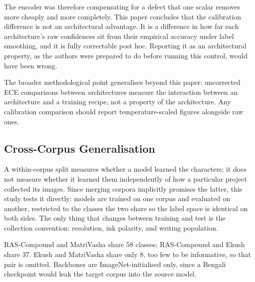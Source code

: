 The encoder was therefore compensating for a defect that one scalar
removes more cheaply and more completely. This paper concludes that the
calibration difference is not an architectural advantage. It is a
difference in how far each architecture's raw confidences sit from their
empirical accuracy under label smoothing, and it is fully correctable
post hoc. Reporting it as an architectural property, as the authors were
prepared to do before running this control, would have been wrong.

The broader methodological point generalises beyond this paper:
uncorrected ECE comparisons between architectures measure the
interaction between an architecture and a training recipe, not a
property of the architecture. Any calibration comparison should report
temperature-scaled figures alongside raw ones.

\hypertarget{cross-corpus-generalisation}{%
\subsection{Cross-Corpus
Generalisation}\label{cross-corpus-generalisation}}

A within-corpus split measures whether a model learned the characters;
it does not measure whether it learned them independently of how a
particular project collected its images. Since merging corpora
implicitly promises the latter, this study tests it directly: models are trained on one corpus and evaluated on another, restricted to the classes the two share so
the label space is identical on both sides. The only thing that changes
between training and test is the collection convention: resolution,
ink polarity, and writing population.

RAS-Compound and MatriVasha share 58 classes; RAS-Compound and Ekush
share 37. Ekush and MatriVasha share only 8, too few to be informative,
so that pair is omitted. Backbones are ImageNet-initialised only, since
a Bengali checkpoint would leak the target corpus into the source model.

